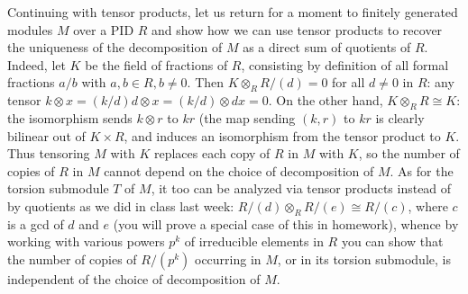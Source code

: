 Continuing with tensor products, let us return for a moment to finitely generated modules $M$ over a PID $R$ and show how we can use tensor products to recover the uniqueness of the decomposition of $M$ as a direct sum of quotients of $R$.  Indeed, let $K$ be the field of fractions of $R$, consisting by definition of all formal fractions $a/b$ with $a,b\in R,b\ne0$.  Then $K\otimes_R R/(d) = 0$ for
all $d\ne0$ in $R$:  any tensor $k\otimes x = (k/d)d \otimes x = (k/d)\otimes dx = 0$.  On the other hand, $K\otimes_R R\cong K$:  the isomorphism sends $k\otimes r$ to $kr$ (the map sending $(k,r)$
to $kr$ is clearly bilinear out of $K\times R$, and induces an isomorphism from the tensor product to
$K$.  Thus  tensoring $M$ with $K$ replaces each copy of $R$ in $M$ with $K$, so the number of copies of $R$ in $M$ cannot depend on the choice of decomposition of $M$.  As for the torsion submodule $T$ of $M$, it too can be analyzed via tensor products instead of by quotients as we did in class last week:  $R/(d)\otimes_R R/(e)\cong R/(c)$, where $c$ is a gcd of $d$ and $e$ (you will prove a special case of this in homework), whence by working with various powers $p^k$ of irreducible elements in $R$ you can show that the number of copies of $R/(p^k)$ occurring in $M$, or in its torsion submodule, is independent of the choice of decomposition of $M$.

